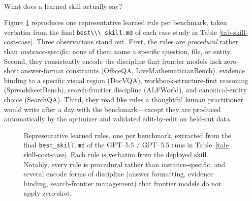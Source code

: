\documentclass[
]{article}
\makeatletter
\let\oldparagraph\paragraph
\renewcommand{\paragraph}{
    \@ifstar
      \xxxParagraphStar
      \xxxParagraphNoStar
  }
\newcommand{\xxxParagraphStar}[1]{\oldparagraph*{#1}\mbox{}}
\newcommand{\xxxParagraphNoStar}[1]{\oldparagraph{#1}\mbox{}}
\newcommand{\passthrough}[1]{#1}
\newcounter{none} %
\makeatother
\begin{document}
\paragraph{What does a learned skill actually
say?}\label{what-does-a-learned-skill-actually-say}

Figure \ref{fig-skill-excerpts} reproduces one representative learned
rule per benchmark, taken verbatim from the final
\passthrough{\lstinline!best\\\_skill.md!} of each case study in Table
\ref{tab-skill-cost-case}. Three observations stand out. First, the
rules are \emph{procedural} rather than \emph{instance-specific}: none
of them name a specific question, file, or entity. Second, they
consistently encode the discipline that frontier models lack zero-shot:
answer-format constraints (OfficeQA, LiveMathematicianBench), evidence
binding to a specific visual region (DocVQA), workbook-structure-first
reasoning (SpreadsheetBench), search-frontier discipline (ALFWorld), and
canonical-entity choice (SearchQA). Third, they read like rules a
thoughtful human practitioner would write after a day with the
benchmark---except they are produced automatically by the optimizer and
validated edit-by-edit on held-out data.

\begin{figure}[t]
\centering
{}
\caption{Representative learned rules, one per benchmark, extracted from the final \texttt{best\_skill.md} of the GPT--5.5 / GPT--5.5 runs in Table~\ref{tab-skill-cost-case}. Each rule is verbatim from the deployed skill. Notably, every rule is procedural rather than instance-specific, and several encode forms of discipline (answer formatting, evidence binding, search-frontier management) that frontier models do not apply zero-shot.}
\label{fig-skill-excerpts}
\end{figure}
\end{document}
